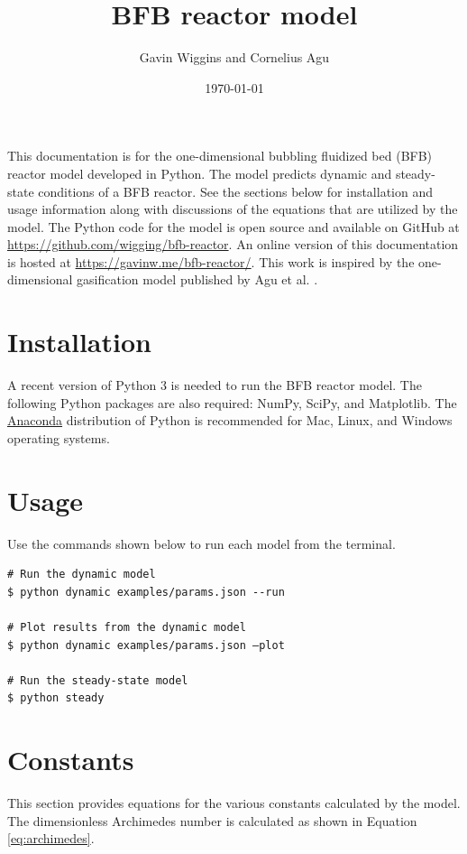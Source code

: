 \documentclass[12pt]{article}
\title{\textbf{BFB reactor model}}
\author{Gavin Wiggins and Cornelius Agu}
\date{\today}
\begin{document}
\maketitle

This documentation is for the one-dimensional bubbling fluidized bed (BFB) reactor model developed in Python. The model predicts dynamic and steady-state conditions of a BFB reactor. See the sections below for installation and usage information along with discussions of the equations that are utilized by the model. The Python code for the model is open source and available on GitHub at \url{https://github.com/wigging/bfb-reactor}. An online version of this documentation is hosted at \url{https://gavinw.me/bfb-reactor/}. This work is inspired by the one-dimensional gasification model published by Agu et al. \cite{Agu-2019f}.

\section{Installation}

A recent version of Python 3 is needed to run the BFB reactor model. The following Python packages are also required: NumPy, SciPy, and Matplotlib. The \href{https://www.anaconda.com/products/individual}{Anaconda} distribution of Python is recommended for Mac, Linux, and Windows operating systems.

\section{Usage}

Use the commands shown below to run each model from the terminal.

\begin{verbatim}
# Run the dynamic model
$ python dynamic examples/params.json --run

# Plot results from the dynamic model
$ python dynamic examples/params.json –plot

# Run the steady-state model
$ python steady
\end{verbatim}

\section{Constants}

This section provides equations for the various constants calculated by the model. The dimensionless Archimedes number is calculated as shown in Equation \ref{eq:archimedes}.
\end{document}
